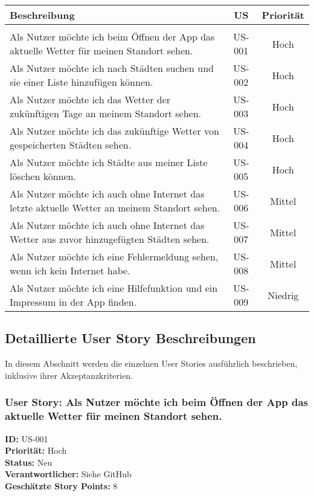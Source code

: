 \documentclass{article}
\begin{document}
\small %
\begin{longtable}{|>{\RaggedRight}X|c|c|}
\hline
\textbf{Beschreibung} & \textbf{US} & \textbf{Priorität} \\
\hline
\endhead %

\hline
\multicolumn{3}{|r|}{Fortsetzung auf nächster Seite} \\
\hline
\endfoot %

\hline
\endlastfoot %

Als Nutzer möchte ich beim Öffnen der App das aktuelle Wetter für meinen Standort sehen. & US-001 & Hoch \\
Als Nutzer möchte ich nach Städten suchen und sie einer Liste hinzufügen können. & US-002 & Hoch \\
Als Nutzer möchte ich das Wetter der zukünftigen Tage an meinem Standort sehen. & US-003 & Hoch \\
Als Nutzer möchte ich das zukünftige Wetter von gespeicherten Städten sehen. & US-004 & Hoch \\
Als Nutzer möchte ich Städte aus meiner Liste löschen können. & US-005 & Hoch \\
Als Nutzer möchte ich auch ohne Internet das letzte aktuelle Wetter an meinem Standort sehen. & US-006 & Mittel \\
Als Nutzer möchte ich auch ohne Internet das Wetter aus zuvor hinzugefügten Städten sehen. & US-007 & Mittel \\
Als Nutzer möchte ich eine Fehlermeldung sehen, wenn ich kein Internet habe. & US-008 & Mittel \\
Als Nutzer möchte ich eine Hilfefunktion und ein Impressum in der App finden. & US-009 & Niedrig \\
\end{longtable}

\normalsize
\subsection{Detaillierte User Story Beschreibungen}

In diesem Abschnitt werden die einzelnen User Stories ausführlich beschrieben, inklusive ihrer Akzeptanzkriterien.
\newpage
\subsubsection{User Story: Als Nutzer möchte ich beim Öffnen der App das aktuelle Wetter für meinen Standort sehen.}
\textcolor{storyblue}{\textbf{ID:}} US-001 \\
\textcolor{storyblue}{\textbf{Priorität:}} Hoch \\
\textcolor{storyblue}{\textbf{Status:}} Neu \\
\textcolor{storyblue}{\textbf{Verantwortlicher:}} Siehe GitHub \\
\textcolor{storyblue}{\textbf{Geschätzte Story Points:}} 8
\end{document}
